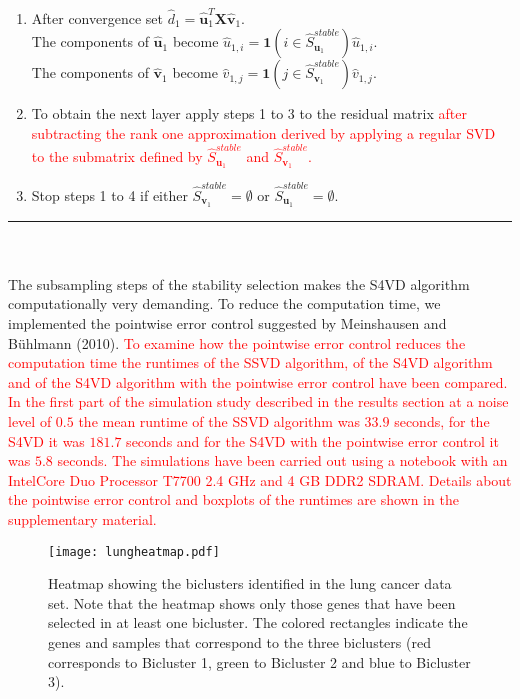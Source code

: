 \documentclass{bioinfo}
\begin{document}
\begin{methods}
\begin{enumerate}
\begin{enumerate}
  \end{enumerate} 
  \item After convergence set $\hat{d}_{1}=\mathbf{\hat{u}}_{1}^{T}\mathbf{X}\mathbf{\hat{v}}_{1}$. \\
  The components of $\hat{\mathbf{u}}_{1}$ become $\hat{u}_{1,i}=\mathbf{1}(i \in \hat{S}_{\mathbf{u}_{1}}^{stable})\hat{u}_{1,i}$. \\
  The components of $\hat{\mathbf{v}}_{1}$ become $\hat{v}_{1,j}=\mathbf{1}(j \in \hat{S}_{\mathbf{v}_{1}}^{stable})\hat{v}_{1,j}$. 
 \item To obtain the next layer apply steps 1 to 3 to the residual matrix \textcolor{red}{after subtracting the rank one approximation derived by applying a regular SVD to the submatrix defined by $\hat{S}_{\mathbf{u}_{1}}^{stable}$ and $\hat{S}_{\mathbf{v}_{1}}^{stable}$.}
 \item Stop steps 1 to 4 if either $\hat{S}_{\mathbf{v}_{1}}^{stable}=\emptyset$ or $\hat{S}_{\mathbf{u}_{1}}^{stable}=\emptyset$.
\end{enumerate}
\hspace{-0.1cm} 
\rule{8.5 cm}{1pt}
\\
\\
The subsampling steps of the stability selection makes the S4VD algorithm computationally very demanding. To reduce the computation time, we implemented the pointwise error control suggested by Meinshausen and B\"uhlmann (2010). \textcolor{red}{To examine how the pointwise error control reduces the computation time the runtimes of the SSVD algorithm, of the S4VD algorithm and of the S4VD algorithm with the pointwise error control have been compared. In the first part of the simulation study described in the results section at a noise level of $0.5$ the mean runtime of the SSVD algorithm was $33.9$ seconds, for the S4VD it was $181.7$ seconds and for the S4VD with the pointwise error control it was $5.8$ seconds. The simulations have been carried out using a notebook with an Intel\textregistered Core Duo Processor T7700 2.4 GHz and 4 GB DDR2 SDRAM. Details about the pointwise error control and boxplots of the runtimes are shown in the supplementary material.}
\end{methods}
\begin{figure*}[t]
\texttt{[image: lungheatmap.pdf]}
\caption{ Heatmap showing the biclusters identified in the lung cancer data set. Note that the heatmap shows only those genes that have been selected in at least one bicluster. The colored rectangles indicate the genes and samples that correspond to the three biclusters (red corresponds to Bicluster 1, green to Bicluster 2 and blue to Bicluster 3). \label{fig:01} 
}
\end{figure*}
\end{document}
